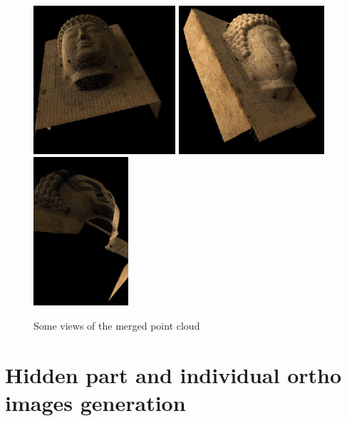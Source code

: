 \begin{figure}
\begin{center}
\includegraphics[height=55mm]{FIGS/Boudhas/PL-F2-A.jpg}
\includegraphics[height=55mm]{FIGS/Boudhas/PL-F2-B.jpg}
\includegraphics[height=55mm]{FIGS/Boudhas/PL-F2-C.jpg}
\caption{Some views of the merged point cloud}
\label{BOUDHA:CLOUD:OUTPUT:MERGE}
\end{center}
\end{figure}


\section{Hidden part and individual ortho images generation}


